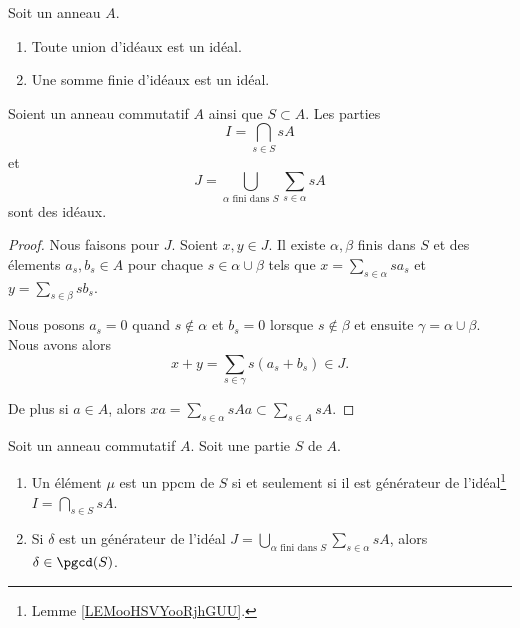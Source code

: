 \begin{lemma}[\cite{}]	\label{LEMooSEIAooYVIvPK}
	Soit un anneau \( A\).
	\begin{enumerate}
		\item
		      Toute union d'idéaux est un idéal.
		\item
		      Une somme finie d'idéaux est un idéal.
	\end{enumerate}
\end{lemma}


\begin{lemma}	\label{LEMooHSVYooRjhGUU}
	Soient un anneau commutatif \( A\) ainsi que \( S\subset A\). Les parties
	\begin{equation}
		I=\bigcap_{s\in S}sA
	\end{equation}
	et
	\begin{equation}
		J=\bigcup_{\alpha\text{ fini dans }S}\sum_{s\in \alpha}sA
	\end{equation}
	sont des idéaux.
\end{lemma}

\begin{proof}
	Nous faisons pour \( J\). Soient \( x,y\in J\). Il existe \( \alpha,\beta\) finis dans \( S\) et des élements \( a_s,b_s\in A\) pour chaque \( s\in \alpha\cup\beta\) tels que \( x=\sum_{s\in \alpha}sa_s\) et \( y=\sum_{s\in\beta}sb_s\).

	Nous posons \( a_s=0\) quand \( s\not\in \alpha\) et \( b_s=0\) lorsque \( s\not\in\beta\) et ensuite \( \gamma=\alpha\cup\beta\). Nous avons alors
	\begin{equation}
		x+y=\sum_{s\in\gamma}s(a_s+b_s)\in J.
	\end{equation}

	De plus si \( a\in A\), alors \( xa=\sum_{s\in\alpha}sAa\subset \sum_{s\in A}sA\).
\end{proof}


\begin{proposition}	\label{PROPooMMHPooZYzvdK}
	Soit un anneau commutatif \( A\). Soit une partie \( S\) de \( A\).
	\begin{enumerate}
		\item		\label{ITEMooJKGMooCqWYOq}
		      Un élément \( \mu\) est un ppcm de \( S\) si et seulement si il est générateur de l'idéal\footnote{Lemme \ref{LEMooHSVYooRjhGUU}.} \( I=\bigcap_{s\in S}sA\).
		\item		\label{ITEMooZUCVooRIpnhU}
		      Si \( \delta\) est un générateur de l'idéal \( J=\bigcup_{\alpha\text{ fini dans }S}\sum_{s\in \alpha}sA\), alors \( \delta\in\pgcd(S)\).
	\end{enumerate}
\end{proposition}

